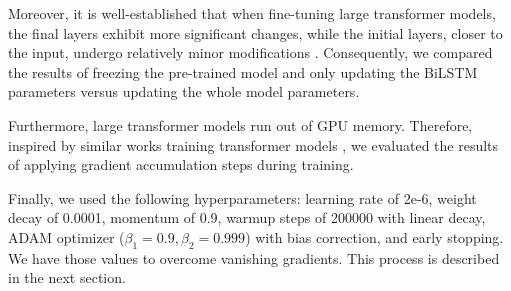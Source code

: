  Moreover, it is well-established that when fine-tuning large transformer models, the final layers exhibit more significant changes, while the initial layers, closer to the input, undergo relatively minor modifications \cite{merchant2020happens,lee2019would,kovaleva2019revealing}. Consequently, we compared the results of freezing the pre-trained model and only updating the BiLSTM parameters versus updating the whole model parameters. 

Furthermore, large transformer models run out of GPU memory. Therefore, inspired by similar works training transformer models \cite{anil2021large,zhang2023adam,huang2023measuring}, we evaluated the results of applying gradient accumulation steps during training.

Finally, we used the following hyperparameters: learning rate of 2e-6, weight decay of 0.0001, momentum of 0.9, warmup steps of 200000 with linear decay, ADAM optimizer ($\beta_1 = 0.9, \beta_2=0.999$) with bias correction, and early stopping. We have those values to overcome vanishing gradients. This process is described in the next section.

